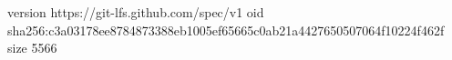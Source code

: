 version https://git-lfs.github.com/spec/v1
oid sha256:c3a03178ee8784873388eb1005ef65665c0ab21a4427650507064f10224f462f
size 5566
